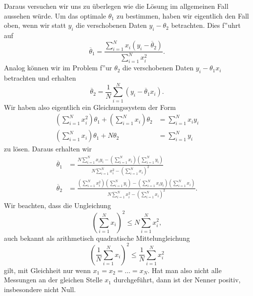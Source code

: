 \documentclass[letterpaper,10pt,english]{jupyterBook}
\begin{document}
Daraus versuchen wir uns zu überlegen wie die Lösung im allgemeinen Fall aussehen würde. Um das optimale \(\theta_1\) zu bestimmen, haben wir eigentlich den Fall oben, wenn wir statt \(y_i\) die verschobenen Daten \(y_i - \theta_2\) betrachten.
Dies f”uhrt auf
\begin{equation*}
 \overline{\theta}_1 = \frac{\sum_{i=1}^N  x_i (y_i-\overline{\theta}_2)}{\sum_{i=1}^N  x_i^2}.\end{equation*}
Analog können wir im Problem f”ur \(\theta_2\) die verschobenen Daten \(y_i - \theta_1 x_i\) betrachten und erhalten
\begin{equation*}
 \overline{\theta}_2 = \frac{1}N \sum_{i=1}^N   (y_i - \overline{\theta}_1 x_i).\end{equation*}
Wir haben also eigentlich ein Gleichungssystem der Form
\label{equation:vorkurs/regression:cecadb3a-3731-4682-ab77-516d581e0bb2}\begin{align}
(\sum_{i=1}^N x_i^2) \theta_1 + (\sum_{i=1}^N x_i) \theta_2 &= \sum_{i=1}^N x_i y_i \\
(\sum_{i=1}^N x_i) \theta_1 + N \theta_2 &= \sum_{i=1}^N y_i
\end{align}
zu lösen. Daraus erhalten wir
\label{equation:vorkurs/regression:4a1595a2-887c-40d5-a341-01f9c08dea66}\begin{align}
\overline{\theta}_1 &=  \frac{N \sum_{i=1}^N x_i y_i - (\sum_{i=1}^N x_i) (\sum_{i=1}^N y_i)}{N \sum_{i=1}^N x_i^2 - (\sum_{i=1}^N x_i)^2} \\
\overline{\theta}_2 &=  \frac{(\sum_{i=1}^N x_i^2) (\sum_{i=1}^N y_i) - (\sum_{i=1}^N x_i y_i) (\sum_{i=1}^N x_i)}{N \sum_{i=1}^N x_i^2 - (\sum_{i=1}^N x_i)^2}.
\end{align}
Wir beachten, dass die Ungleichung
\begin{equation*}
 (\sum_{i=1}^N x_i)^2 \leq N \sum_{i=1}^N x_i^2,\end{equation*}
auch bekannt als arithmetisch quadratische Mittelungleichung
\begin{equation*}
 (\frac{1}N \sum_{i=1}^N x_i)^2 \leq \frac{1}N  \sum_{i=1}^N x_i^2
\end{equation*}
gilt, mit Gleichheit nur wenn \(x_1=x_2=\ldots=x_N\). Hat man also nicht alle Messungen an der gleichen Stelle \(x_1\) durchgeführt, dann ist der Nenner positiv, insbesondere nicht Null.
\end{document}
